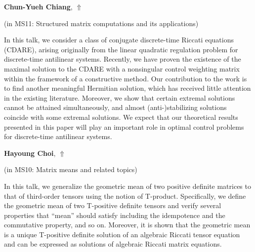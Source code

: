 \documentclass[ILAS2025-program.tex]{subfiles}
\begin{document}
\hypertarget{down0268}{}\begin{ilasabstract}
    
\textbf{Chun-Yueh Chiang},  \hfill \hyperlink{up0268}{$\Uparrow$}
    
    
(in {\color{mstitle}MS11: Structured matrix computations and its applications})
        
\mtskip
    In this talk, we consider a class of conjugate discrete-time Riccati equations (CDARE), arising originally
from the linear quadratic regulation problem for discrete-time antilinear systems. Recently, we have proven
the existence of the maximal solution to the CDARE with a nonsingular control weighting matrix within
the framework of a constructive method. Our contribution to the work is to find another meaningful
Hermitian solution, which has received little attention in the existing literature. Moreover, we show that
certain extremal solutions cannot be attained simultaneously, and almost (anti-)stabilizing solutions coincide
with some extremal solutions. We expect that our theoretical results presented in this paper will play an
important role in optimal control problems for discrete-time antilinear systems.

\end{ilasabstract}
    

\hypertarget{down0024}{}\begin{ilasabstract}
    
\textbf{Hayoung Choi},  \hfill \hyperlink{up0024}{$\Uparrow$}
    
    
(in {\color{mstitle}MS10: Matrix means and related topics})
        
\mtskip
    In this talk, we generalize the geometric mean of two positive definite matrices to that of third-order tensors using the notion of T-product. Specifically, we define the geometric mean of two T-positive definite tensors and verify several properties that ``mean'' should satisfy including the idempotence and the commutative property, and so on. Moreover, it is shown that the geometric mean is a unique T-positive definite solution of an algebraic Riccati tensor equation and can be expressed as solutions of algebraic Riccati matrix equations. 

\end{ilasabstract}
    
\end{document}
